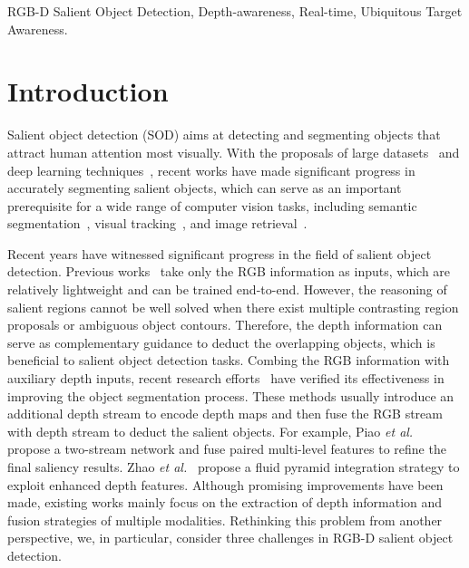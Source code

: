 \documentclass[journal]{IEEEtran}
\def\etal{{\em et al.}}
\begin{document}
\begin{IEEEkeywords}
RGB-D Salient Object Detection, Depth-awareness, Real-time, Ubiquitous Target Awareness.
\end{IEEEkeywords}








\IEEEpeerreviewmaketitle


\section{Introduction}

Salient object detection (SOD) aims at detecting and segmenting objects that attract human attention most visually. With the proposals of large datasets~\cite{ju2014depth,peng2014rgbd,niu2012leveraging,yan2013hierarchical,li2015visual,wang2017learning} and deep learning techniques~\cite{he2016deep,long2015fully}, recent works have made significant progress in accurately segmenting salient objects,
which can serve as an important prerequisite for a wide range of computer vision tasks, including semantic segmentation~\cite{lai2016saliency}, visual tracking~\cite{hong2015online}, and image retrieval~\cite{shao2006specific}.

Recent years have witnessed significant progress in the field of salient object detection. Previous works~\cite{liu2018picanet,li2019constrained,wu2019cascaded,li2021salient,zhao2019pyramid,su2019selectivity,qin2019basnet,F3Net,li2020parallel,ma2021pyramidal} take only the RGB information as inputs, which are relatively lightweight and can be trained end-to-end.
However, the reasoning of salient regions cannot be well solved when there exist multiple contrasting region proposals or ambiguous object contours. Therefore, the depth information can serve as complementary guidance to deduct the overlapping objects, which is beneficial to salient object detection tasks.
Combing the RGB information with auxiliary depth inputs, recent research efforts~\cite{qu2017rgbd,chen2018progressively,chen2019multi,chen2019three,
zhang2020select,fan2019D3Net,chen2020dpanet,li2020asif,zhang2020uc,li2020rgb,li2020icnet,chen2020rgbd,Wei2020ECCV,oursMM,bai2021circular,zhao2019contrast,zhang2020uc,fan2020bbs} have verified its effectiveness in improving the object segmentation process.
These methods usually introduce an additional depth stream to encode depth maps and then fuse the RGB stream with depth stream to deduct the salient objects. For example, Piao \etal~\cite{piao2019depth} propose a two-stream network and fuse paired multi-level features to refine the final saliency results. Zhao \etal~\cite{zhao2019pyramid} propose a fluid pyramid integration strategy to exploit enhanced depth features.
Although promising improvements have been made, existing works mainly focus on the extraction of depth information and fusion strategies of multiple modalities. Rethinking this problem from another perspective, we, in particular, consider three challenges in RGB-D salient object detection.
\end{document}
